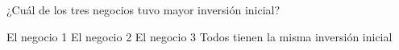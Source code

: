 ¿Cuál de los tres negocios tuvo mayor inversión inicial?

\begin{choices}
    \CorrectChoice El negocio 1
    \choice El negocio 2
    \choice El negocio 3
    \choice Todos tienen la misma inversión inicial
\end{choices}